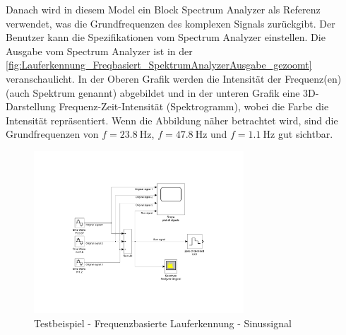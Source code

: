 Danach wird in diesem Model ein Block \glqq Spectrum Analyzer\grqq{} als Referenz verwendet, was die Grundfrequenzen des komplexen Signals zurückgibt. Der Benutzer kann die Spezifikationen vom \glqq Spectrum Analyzer\grqq{} einstellen. Die Ausgabe vom \glqq Spectrum Analyzer\grqq{} ist in der \autoref{fig:Lauferkennung_Freqbasiert_SpektrumAnalyzerAusgabe_gezoomt} veranschaulicht. In der Oberen Grafik werden die Intensität der Frequenz(en) (auch Spektrum genannt) abgebildet und in der unteren Grafik eine 3D-Darstellung \glqq Frequenz-Zeit-Intensität\grqq{} (Spektrogramm), wobei die Farbe die Intensität repräsentiert. Wenn die Abbildung näher betrachtet wird, sind die Grundfrequenzen von $f=\SI{23,8}{\hertz}$, $f=\SI{47,8}{\hertz}$ und $f=\SI{1,1}{\hertz}$ gut sichtbar.

\begin{figure}
	\centering
	\includegraphics[width=0.7\textwidth]{Bilder/Lauferkennung_Freqbasiert_TestBeispiel_SinussignalGenerator.pdf}
	\caption{Testbeispiel - Frequenzbasierte Lauferkennung - Sinussignal}
	\label{fig:Lauferkennung_Freqbasiert_TestBeispiel_SinussignalGenerator}
\end{figure}



